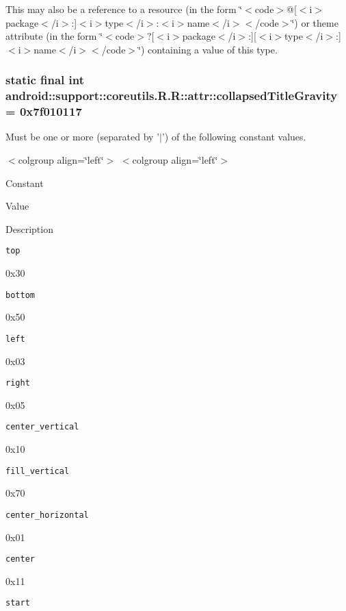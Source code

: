 This may also be a reference to a resource (in the form \char`\"{}$<$code$>$@\mbox{[}$<$i$>$package$<$/i$>$:\mbox{]}$<$i$>$type$<$/i$>$:$<$i$>$name$<$/i$>$$<$/code$>$\char`\"{}) or theme attribute (in the form \char`\"{}$<$code$>$?\mbox{[}$<$i$>$package$<$/i$>$:\mbox{]}\mbox{[}$<$i$>$type$<$/i$>$:\mbox{]}$<$i$>$name$<$/i$>$$<$/code$>$\char`\"{}) containing a value of this type. \hypertarget{classandroid_1_1support_1_1coreutils_1_1_r_1_1attr_cbf53796bde3e8e790deea8d556b8200}{
\subsubsection[{collapsedTitleGravity}]{\setlength{\rightskip}{0pt plus 5cm}static final int android::support::coreutils.R.R::attr::collapsedTitleGravity = 0x7f010117}}
\label{classandroid_1_1support_1_1coreutils_1_1_r_1_1attr_cbf53796bde3e8e790deea8d556b8200}


Must be one or more (separated by '$|$') of the following constant values. \begin{TabularC}{0}
\hline
\end{TabularC}
$<$colgroup align=\char`\"{}left\char`\"{}$>$ $<$colgroup align=\char`\"{}left\char`\"{}$>$ 

Constant

Value

Description 

{\tt top}

0x30

{\tt bottom}

0x50

{\tt left}

0x03

{\tt right}

0x05

{\tt center\_\-vertical}

0x10

{\tt fill\_\-vertical}

0x70

{\tt center\_\-horizontal}

0x01

{\tt center}

0x11

{\tt start}

